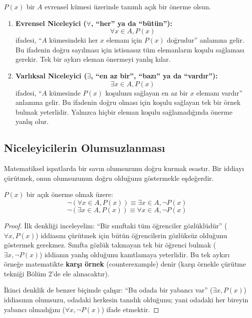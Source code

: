 \begin{definition}
$P(x)$ bir $A$ evrensel kümesi üzerinde tanımlı açık bir önerme olsun.
\begin{enumerate}
  \item \textbf{Evrensel Niceleyici ($\forall$, ``her'' ya da ``bütün''):} 
  \[ \forall x \in A, P(x) \]
  ifadesi, ``$A$ kümesindeki her $x$ elemanı için $P(x)$ doğrudur'' anlamına gelir. Bu ifadenin doğru sayılması için istisnasız tüm elemanların koşulu sağlaması gerekir. Tek bir aykırı eleman önermeyi yanlış kılar.
  
  \item \textbf{Varlıksal Niceleyici ($\exists$, ``en az bir'', ``bazı'' ya da ``vardır''):}
  \[ \exists x \in A, P(x) \]
  ifadesi, ``$A$ kümesinde $P(x)$ koşulunu sağlayan en az bir $x$ elemanı vardır'' anlamına gelir. Bu ifadenin doğru olması için koşulu sağlayan tek bir örnek bulmak yeterlidir. Yalnızca hiçbir eleman koşulu sağlamadığında önerme yanlış olur.
\end{enumerate}
\end{definition}

\subsection{Niceleyicilerin Olumsuzlanması}

Matematiksel ispatlarda bir savın olumsuzunu doğru kurmak esastır. Bir iddiayı çürütmek, onun olumsuzunun doğru olduğunu göstermekle eşdeğerdir.

\begin{theorem}
$P(x)$ bir açık önerme olmak üzere:
\[ \neg (\forall x \in A, P(x)) \equiv \exists x \in A, \neg P(x) \]
\[ \neg (\exists x \in A, P(x)) \equiv \forall x \in A, \neg P(x) \]
\end{theorem}
\begin{proof}
İlk denkliği inceleyelim: ``Bir sınıftaki tüm öğrenciler gözlüklüdür'' ($\forall x, P(x)$) iddiasını çürütmek için bütün öğrencilerin gözlüksüz olduğunu göstermek gerekmez. Sınıfta gözlük takmayan tek bir öğrenci bulmak ($\exists x, \neg P(x)$) iddianın yanlış olduğunu kanıtlamaya yeterlidir. Bu tek aykırı örneğe matematikte \textbf{karşı örnek} (counterexample) denir (karşı örnekle çürütme tekniği Bölüm 2'de ele alınacaktır).

İkinci denklik de benzer biçimde çalışır: ``Bu odada bir yabancı var'' ($\exists x, P(x)$) iddiasının olumsuzu, odadaki herkesin tanıdık olduğunu; yani odadaki her bireyin yabancı olmadığını ($\forall x, \neg P(x)$) ifade etmektir.
\end{proof}

